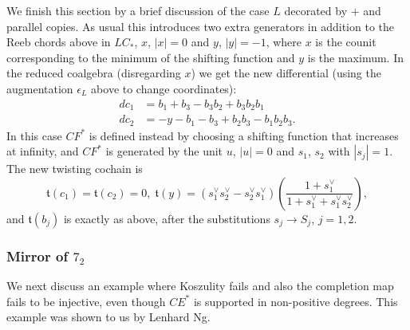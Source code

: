 \documentclass{gtpart}
\renewcommand{\t}{\mathfrak{t}}
\begin{document}
We finish this section by a brief discussion of the case $L$ decorated by $+$ and parallel copies. As usual this introduces two extra generators in addition to the Reeb chords above in $LC_{\ast}$, $x$, $|x|=0$ and $y$, $|y|=-1$, where $x$ is the counit corresponding to the minimum of the shifting function and $y$ is the maximum. In the reduced coalgebra (disregarding $x$) we get the new differential (using the augmentation $\epsilon_{L}$ above to change coordinates): 
\begin{align*}
dc_1 &= b_{1} + b_{3} - b_{3}b_{2}+b_{3}b_{2}b_{1} \\
dc_2 &=-y - b_{1} - b_{3} +b_{2}b_{3} - b_{1}b_{2}b_{3}. 
\end{align*}
In this case $CF^{\ast}$ is defined instead by choosing a shifting function that increases at infinity, and $CF^{\ast}$ is generated by the unit $u$, $|u|=0$ and $s_{1}$, $s_{2}$ with $|s_{j}|=1$. The new twisting cochain is
\[ 
\t(c_{1})=\t(c_{2})=0,\; \t(y)= \left(s_{1}^{\vee}s_{2}^{\vee}-s_{2}^{\vee}s_{1}^{\vee}\right)\left(\frac{1+s_{1}^{\vee}}{1+s_{1}^{\vee}+s_{1}^{\vee}s_{2}^{\vee}}\right),
\]
and $\t(b_{j})$ is exactly as above, after the substitutions $s_{j}\to S_{j}$, $j=1,2$. 


\subsubsection{Mirror of $7_2$}\label{lenny}

We next discuss an example where Koszulity fails and also the completion map fails to be injective,
even though $CE^*$ is supported in non-positive degrees. This
example was shown to us by Lenhard Ng. 
\end{document}
